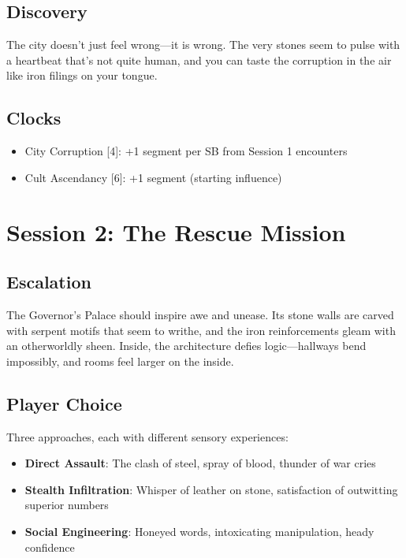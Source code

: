 \documentclass[11pt]{article}
\begin{document}
\subsection{Discovery}

The city doesn't just feel wrong—it is wrong. The very stones seem to pulse with a heartbeat that's not quite human, and you can taste the corruption in the air like iron filings on your tongue.

\subsection{Clocks}
\begin{itemize}[leftmargin=*]
    \item City Corruption [4]: +1 segment per SB from Session 1 encounters
    \item Cult Ascendancy [6]: +1 segment (starting influence)
\end{itemize}

\newpage

\section{Session 2: The Rescue Mission}

\subsection{Escalation}

The Governor's Palace should inspire awe and unease. Its stone walls are carved with serpent motifs that seem to writhe, and the iron reinforcements gleam with an otherworldly sheen. Inside, the architecture defies logic—hallways bend impossibly, and rooms feel larger on the inside.

\subsection{Player Choice}

Three approaches, each with different sensory experiences:
\begin{itemize}[leftmargin=*]
    \item \textbf{Direct Assault}: The clash of steel, spray of blood, thunder of war cries
    \item \textbf{Stealth Infiltration}: Whisper of leather on stone, satisfaction of outwitting superior numbers
    \item \textbf{Social Engineering}: Honeyed words, intoxicating manipulation, heady confidence
\end{itemize}
\end{document}
